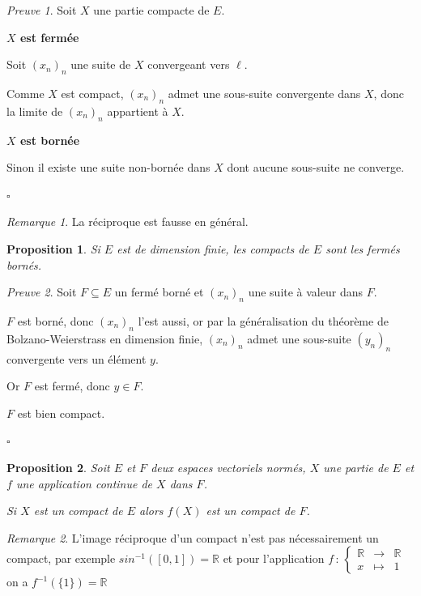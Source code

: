 \documentclass[]{article}
\newtheorem{myproposition}{Proposition}
\theoremstyle{remark}
\newtheorem{myrem}{Remarque}
\newtheorem{myproof}{Preuve}
\theoremstyle{definition}
\newcommand{\cqfd}{
	\hfill$\square$
}
\newcommand{\func}[5]{
#1 \, : \, \left\{ \begin{array}{lcl}
	#2 & \longrightarrow & #3 \\
	#4 & \longmapsto & #5
\end{array}
\right.
}
\newenvironment{proofpart}[1]{
	\noindent
	{\textbf{\boldmath #1}}
}{
	\checkmark
}
\begin{document}
\begin{myproof}
	Soit $X$ une partie compacte de $E$.
	
	\begin{proofpart}{$X$ est fermée}
		Soit $(x_n)_n$ une suite de $X$ convergeant vers $\ell$.
		
		Comme $X$ est compact, $(x_n)_n$ admet une sous-suite convergente dans $X$, donc la limite de $(x_n)_n$ appartient à $X$.
	\end{proofpart}
	
	\begin{proofpart}{$X$ est bornée}
		Sinon il existe une suite non-bornée dans $X$ dont aucune sous-suite ne converge.
	\end{proofpart}
	
	\cqfd
\end{myproof}

\begin{myrem}
	La réciproque est fausse en général.
\end{myrem}

\begin{myproposition}
	Si $E$ est de dimension finie, les compacts de $E$ sont les fermés bornés.
\end{myproposition}

\begin{myproof}
	Soit $F \subseteq E$ un fermé borné et $(x_n)_n$ une suite à valeur dans $F$.
	
	$F$ est borné, donc $(x_n)_n$ l'est aussi, or par la généralisation du théorème de Bolzano-Weierstrass en dimension finie, $(x_n)_n$ admet une sous-suite $(y_n)_n$ convergente vers un élément $y$.
	
	Or $F$ est fermé, donc $y \in F$.
	
	$F$ est bien compact.
	
	\cqfd
\end{myproof}

\begin{myproposition}
	Soit $E$ et $F$ deux espaces vectoriels normés, $X$ une partie de $E$ et $f$ une application continue de $X$ dans $F$.
	
	Si $X$ est un compact de $E$ alors $f(X)$ est un compact de $F$.
\end{myproposition}

\begin{myrem}
	L'image réciproque d'un compact n'est pas nécessairement un compact, par exemple $sin^{-1}([0, 1])= \mathbb{R}$ et pour l'application $\func{f}{\mathbb{R}}{\mathbb{R}}{x}{1}$ on a  $f^{-1}(\{1\})=\mathbb{R}$
\end{myrem}
\end{document}

